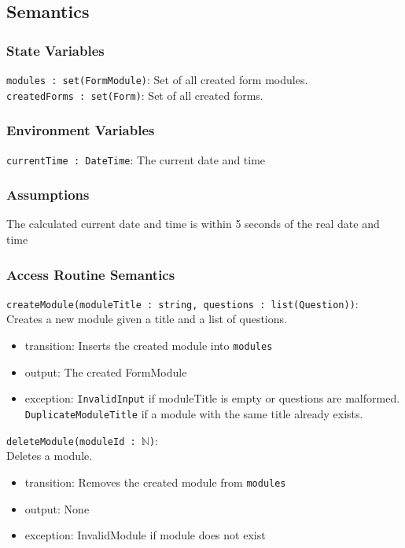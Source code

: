\documentclass[12pt, titlepage]{article}
\begin{document}
\subsection{Semantics}

\subsubsection{State Variables}

\texttt{modules : set(FormModule)}: Set of all created form modules.
\\
\texttt{createdForms : set(Form)}: Set of all created forms.

\subsubsection{Environment Variables}

\texttt{currentTime : DateTime}: The current date and time

\subsubsection{Assumptions}

The calculated current date and time is within 5 seconds of the real date and time

\subsubsection{Access Routine Semantics}

\noindent \texttt{createModule(moduleTitle : string, questions : list(Question))}: \\
Creates a new module given a title and a list of questions.
\begin{itemize}
\item transition: Inserts the created module into \texttt{modules}
\item output: The created FormModule
\item exception: \texttt{InvalidInput} if moduleTitle is empty or questions are malformed. \texttt{DuplicateModuleTitle} if a module with the same title already exists.
\end{itemize}

\noindent \texttt{deleteModule(moduleId : $\mathbb{N}$)}: \\
Deletes a module.
\begin{itemize}
\item transition: Removes the created module from \texttt{modules}
\item output: None
\item exception: InvalidModule if module does not exist
\end{itemize}
\end{document}
